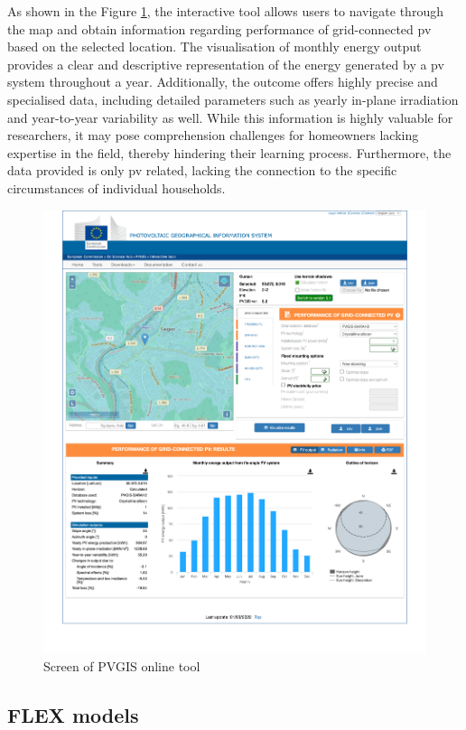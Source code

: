 As shown in the Figure \ref{fig:pvgis}, the interactive tool allows users to navigate through the map and obtain information regarding performance of grid-connected \gls{pv} based on the selected location. 
The visualisation of monthly energy output provides a clear and descriptive representation of the energy generated by a \gls{pv} system throughout a year. 
Additionally, the outcome offers highly precise and specialised data, including detailed parameters such as yearly in-plane irradiation and year-to-year variability as well. 
While this information is highly valuable for researchers, it may pose comprehension challenges for homeowners lacking expertise in the field, thereby hindering their learning process. 
Furthermore, the data provided is only \gls{pv} related, lacking the connection to the specific circumstances of individual households. 
\begin{figure}[h!]
  \centering
  \includegraphics[width=\textwidth]{Images/pvgis.png}
  \caption{Screen of PVGIS online tool}
  \label{fig:pvgis}
\end{figure}


\subsection{FLEX models}

